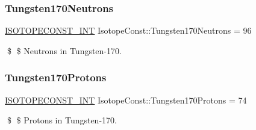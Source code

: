 \subsubsection{\texorpdfstring{Tungsten170\+Neutrons}{Tungsten170Neutrons}}
{\footnotesize\ttfamily \mbox{\hyperlink{group___isotope_const-_macros_ga5f18360b3e99483a35c32d789e62621c}{I\+S\+O\+T\+O\+P\+E\+C\+O\+N\+S\+T\+\_\+\+I\+NT}} Isotope\+Const\+::\+Tungsten170\+Neutrons = 96}

\$ \$ Neutrons in Tungsten-\/170. \mbox{\label{group___isotope_const-_tungsten-_w170_gaede1085f73994bfa66171068767b2e98}} 
\subsubsection{\texorpdfstring{Tungsten170\+Protons}{Tungsten170Protons}}
{\footnotesize\ttfamily \mbox{\hyperlink{group___isotope_const-_macros_ga5f18360b3e99483a35c32d789e62621c}{I\+S\+O\+T\+O\+P\+E\+C\+O\+N\+S\+T\+\_\+\+I\+NT}} Isotope\+Const\+::\+Tungsten170\+Protons = 74}

\$ \$ Protons in Tungsten-\/170. 